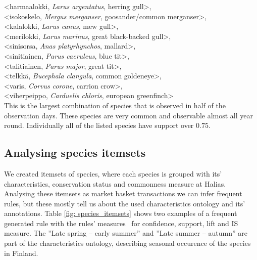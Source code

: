 \documentclass[english]{tktltiki2}
\begin{document}
\hangindent=0.7cm
<harmaalokki, \emph{Larus argentatus}, herring gull>, \\
<isokoskelo, \emph{Mergus merganser}, goosander/common merganser>, \\
<kalalokki, \emph{Larus canus}, mew gull>, \\
<merilokki, \emph{Larus marinus}, great black-backed gull>, \\
<sinisorsa, \emph{Anas platyrhynchos}, mallard>, \\
<sinitiainen, \emph{Parus caeruleus}, blue tit>, \\
<talitiainen, \emph{Parus major}, great tit>, \\
<telkkä, \emph{Bucephala clangula}, common goldeneye>, \\
<varis, \emph{Corvus corone}, carrion crow>, \\
<viherpeippo, \emph{Carduelis chloris}, european greenfinch> \\

This is the largest combination of species that is observed in half of the observation days. These species are very common and observable almost all year round. Individually all of the listed species have support over $0.75$.






\subsection{Analysing species itemsets}

We created itemsets of species, where each species is grouped with its' characteristics, conservation status and commonness measure at Halias. Analysing these itemsets as market basket transactions we can infer frequent rules, but these mostly tell us about the used characteristics ontology and its' annotations. 
Table \ref{fig: species_itemsets} shows two examples of a frequent generated rule with the rules' measures~\cite{tan2006introduction} for confidence, support, lift and IS measure.
The ''Late spring -- early summer'' and ''Late summer -- autumn'' are part of the characteristics ontology, describing seasonal occurence of the species in Finland.
\end{document}
